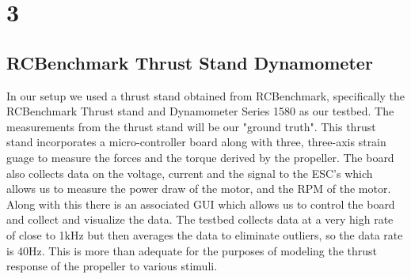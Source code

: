 \documentclass[conference]{IEEEtran}
\begin{document}
	\section{3}
\subsection{RCBenchmark Thrust Stand Dynamometer}
In our setup we used a thrust stand obtained from RCBenchmark, specifically the RCBenchmark Thrust stand and Dynamometer Series 1580 \cite{rcb} as our testbed. The measurements from the thrust stand will be our "ground truth". This thrust stand incorporates a micro-controller board along with three, three-axis strain guage to measure the forces and the torque derived by the propeller. The board also collects data on the voltage, current and the signal to the ESC's which allows us to measure the power draw of the motor, and the RPM of the motor. Along with this there is an associated GUI which allows us to control the board and collect and visualize the data. The testbed collects data at a very high rate of close to 1kHz but then averages the data to eliminate outliers, so the data rate is 40Hz. This is more than adequate for the purposes of modeling the thrust response of the propeller to various stimuli. 
\end{document}
